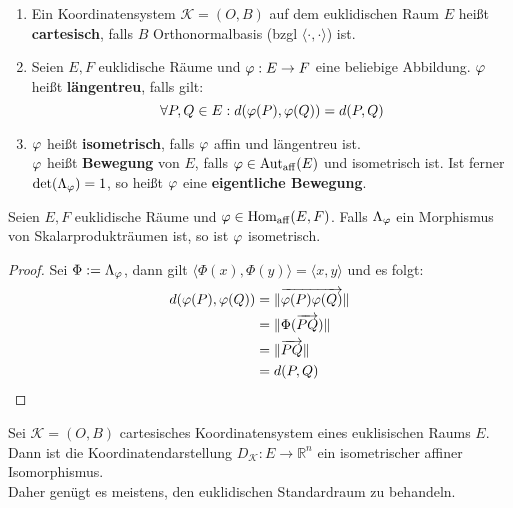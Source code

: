 \documentclass[parskip,a4paper,twoside,DIV15,BCOR12mm]{scrbook}
\begin{document}
\begin{definition}
\begin{enumerate}
\item Ein Koordinatensystem $\mathcal{K}=(O,B)$ auf dem euklidischen Raum $E$ heißt \textbf{cartesisch},
falls $B$ Orthonormalbasis (bzgl $\langle\cdot,\cdot\rangle$) ist.
\item Seien $E,F$ euklidische Räume und $\varphi:E\to F$ eine beliebige Abbildung. $\varphi$ heißt
\textbf{längentreu}, falls gilt:
\[\forall P,Q\in E: d(\varphi(P),\varphi(Q))=d(P,Q)\] 
\item $\varphi$ heißt \textbf{isometrisch}, falls $\varphi$ affin und längentreu ist.\\
$\varphi$ heißt \textbf{Bewegung} von $E$, falls $\varphi\in\operatorname{Aut_{aff}}(E)$ und isometrisch ist.
Ist ferner $\det(\Lambda_\varphi)=1$, so heißt $\varphi$ eine \textbf{eigentliche Bewegung}.
\end{enumerate}
\end{definition}

\begin{comment}
Die Menge aller Bewegungen (schreibe $\Autdist(E)$) ist eine Gruppe mit Untergruppe
der Menge aller eigentlichen Bewegungen (schreibe $\Aut^+_\text{dist}(E)$).
\end{comment}

\begin{lemma}
Seien $E,F$ euklidische Räume und $\varphi\in\operatorname{Hom_{aff}}(E,F)$. Falls $\Lambda_\varphi$ ein 
Morphismus von Skalarprodukträumen ist, so ist $\varphi$ isometrisch.
\end{lemma}

\begin{proof}
Sei $\Phi :=\Lambda_\varphi$, dann gilt $\langle\Phi(x),\Phi(y)\rangle
=\langle x,y\rangle$ und es folgt:
\begin{align*}
d(\varphi(P),\varphi(Q))&=\|\overrightarrow{\varphi(P)\varphi(Q)}\|\\
&=\|\Phi(\overrightarrow{PQ})\|\\
&=\|\overrightarrow{PQ}\|\\
&= d(P,Q)
\end{align*}
\end{proof}

\begin{corollary}
Sei $\mathcal{K}=(O,B)$ cartesisches Koordinatensystem eines euklisischen Raums $E$. Dann
ist die Koordinatendarstellung $D_\mathcal{K}:E\to \mathbb{R}^n$ ein isometrischer affiner
Isomorphismus.\\
Daher genügt es meistens, den euklidischen Standardraum zu behandeln.
\end{corollary}
\end{document}
